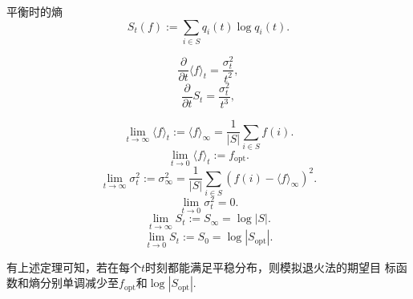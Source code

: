 \begin{definition}{\hei 平衡时的熵}
  \begin{equation}
    S_t(f) := \sum_{i \in S} q_i(t) \log q_i(t).
    \label{eq::Metro_t_entropy}
  \end{equation}
\end{definition}

\begin{theorem}{}
  \begin{equation}
    \frac{\partial}{\partial t}\langle f\rangle_t = \frac{\sigma_t^2}{t^2},
  \end{equation}
  \begin{equation}
    \frac{\partial}{\partial t}S_t = \frac{\sigma_t^2}{t^3},
  \end{equation}
\end{theorem}

\begin{theorem}{}
  \begin{equation}
    \lim_{t \to \infty} \langle f\rangle_t := \langle f\rangle_\infty
    = \frac{1}{|S|}\sum_{i \in S} f(i).
  \end{equation}
  \begin{equation}
    \lim_{t \to 0} \langle f\rangle_t := f_{\mathrm{opt}}.
  \end{equation}
  \begin{equation}
    \lim_{t \to \infty} \sigma_t^2 := \sigma_\infty^2 = \frac{1}{|S|}
    \sum_{i \in S}(f(i) - \langle f\rangle_\infty)^2.
  \end{equation}
  \begin{equation}
    \lim_{t \to 0} \sigma_t^2 = 0.
  \end{equation}
  \begin{equation}
    \lim_{t \to \infty} S_t := S_\infty = \log |S|.
  \end{equation}
  \begin{equation}
    \lim_{t \to 0} S_t := S_0 = \log |S_{\mathrm{opt}}|.
  \end{equation}
\end{theorem}

有上述定理可知，若在每个$t$时刻都能满足平稳分布，则模拟退火法的期望目
标函数和熵分别单调减少至$f_{\mathrm{opt}}$和$\log |S_{\mathrm{opt}}|$.

